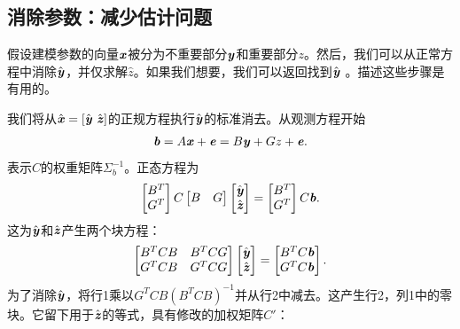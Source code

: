 \subsection{消除参数：减少估计问题}

假设建模参数的向量$\textbf{\textit{x}}$被分为不重要部分$\textbf{\textit{y}}$和重要部分$z$。然后，我们可以从正常方程中消除$\hat{\textbf{\textit{y}}}$，并仅求解$\hat{z}$。如果我们想要，我们可以返回找到$\hat{\textbf{\textit{y}}}$ 。描述这些步骤是有用的。

我们将从$\hat{\textbf{\textit{x}}} = [\hat{\textbf{\textit{y}}} \ \hat{\textbf{\textit{z}}}]$的正规方程执行$\hat{\textbf{\textit{y}}}$的标准消去。从观测方程开始
\begin{align}
\textbf{\textit{b}} = A\textbf{\textit{x}} + \textbf{\textit{e}} = B \textbf{\textit{y}} + Gz + \textbf{\textit{e}}.
\end{align}
表示$C$的权重矩阵$ \Sigma ^{-1}_{b}$。正态方程为
\begin{align}
\begin{bmatrix}
B^{T}\\
G^{T}
\end{bmatrix} C
\begin{bmatrix}
B & G
\end{bmatrix}
\begin{bmatrix}
\hat{\textbf{\textit{y}}}\\
\hat{\textbf{\textit{z}}}
\end{bmatrix} = 
\begin{bmatrix}
B^{T}\\
G^{T}
\end{bmatrix} C \textbf{\textit{b}}.
\end{align}
这为$\hat{\textbf{\textit{y}}}$和$\hat{\textbf{\textit{z}}}$产生两个块方程：
\begin{align}
\begin{bmatrix}
B^{T}CB & B^{T}CG \\
G^{T}CB & G^{T}CG
\end{bmatrix}
\begin{bmatrix}
\hat{\textbf{\textit{y}}}\\
\hat{\textbf{\textit{z}}}
\end{bmatrix} =
\begin{bmatrix}
B^{T}C \textbf{\textit{b}}\\
G^{T}C \textbf{\textit{b}}
\end{bmatrix}.
\end{align}
为了消除$\hat{\textbf{\textit{y}}}$，将行1乘以$G^{T}CB(B^{T}CB)^{-1}$并从行2中减去。这产生行2，列1中的零块。它留下用于$\hat{\textbf{\textit{z}}}$的等式，具有修改的加权矩阵$C'$：

